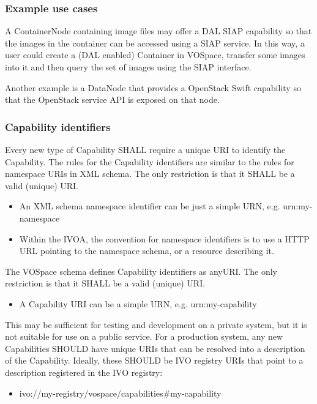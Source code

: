 \documentclass[11pt,a4paper]{ivoa}
\begin{document}
\subsubsection{Example use cases}
\label{subsubsec:example use cases}
A ContainerNode containing image files may offer a DAL SIAP capability so that the images in the container can be accessed using a SIAP service. In this way, a user could create a (DAL enabled) Container in VOSpace, transfer some images into it and then query the set of images using the SIAP interface.

Another example is a DataNode that provides a OpenStack Swift capability so that the OpenStack service API is exposed on that node.

\subsubsection{Capability identifiers}
\label{subsubsec:capability identifiers}
Every new type of Capability SHALL require a unique URI to identify the Capability. The rules for the Capability identifiers are similar to the rules for namespace URIs in XML schema. The only restriction is that it SHALL be a valid (unique) URI.

\begin{itemize}
    \item An XML schema namespace identifier can be just a simple URN, e.g. urn:my-namespace
    \item Within the IVOA, the convention for namespace identifiers is to use a HTTP URL pointing to the namespace schema, or a resource describing it.
\end{itemize}

The VOSpace schema defines Capability identifiers as anyURI. The only restriction is that it SHALL be a valid (unique) URI.

\begin{itemize}
    \item A Capability URI can be a simple URN, e.g. urn:my-capability
\end{itemize}

This may be sufficient for testing and development on a private system, but it is not suitable for use on a public service. For a production system, any new Capabilities SHOULD have unique URIs that can be resolved into a description of the Capability. Ideally, these SHOULD be IVO registry URIs that point to a description registered in the IVO registry:

\begin{itemize}
    \item ivo://my-registry/vospace/capabilities\#my-capability
\end{itemize}
\end{document}
